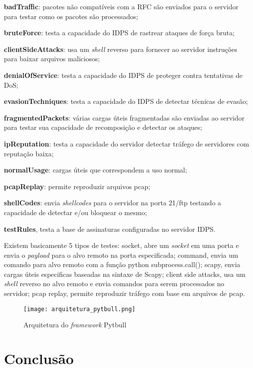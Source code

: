  \begin{alineas}
  \item \textbf{badTraffic}: pacotes não compatíveis com a RFC são enviados para o servidor para testar como os pacotes são processados; 
  \item \textbf{bruteForce}: testa a capacidade do IDPS de rastrear ataques de força bruta;
  \item \textbf{clientSideAttacks}: usa um \textit{shell} reverso para fornecer ao servidor instruções para baixar arquivos maliciosos; 
  \item \textbf{denialOfService}: testa a capacidade do IDPS de proteger contra tentativas de DoS; 
  \item \textbf{evasionTechniques}: testa a capacidade do IDPS de detectar técnicas de evasão; 
  \item \textbf{fragmentedPackets}: várias cargas úteis fragmentadas são enviadas ao servidor para testar sua capacidade de recomposição e detectar os ataques; 
  \item \textbf{ipReputation}: testa a capacidade do servidor detectar tráfego de servidores com reputação baixa;
  \item \textbf{normalUsage}: cargas úteis que correspondem a uso normal; 
  \item \textbf{pcapReplay}: permite reproduzir arquivos pcap; 
  \item \textbf{shellCodes}: envia \textit{shellcodes} para o servidor na porta 21/ftp testando a capacidade de detectar e/ou bloquear o mesmo; 
  \item \textbf{testRules}, testa a base de assinaturas configuradas no servidor IDPS.
 \end{alineas}

 Existem basicamente 5 tipos de testes: socket, abre um \textit{socket} em uma porta e envia o \textit{payload} para o alvo remoto na porta especificada; command, envia um comando para alvo remoto com a função python subprocess.call(); scapy, envia cargas úteis especificas baseadas na sintaxe de Scapy; client side attacks, usa um \textit{shell} reverso no alvo remoto e envia comandos para serem processados no servidor; pcap replay, permite reproduzir tráfego com base em arquivos de pcap.

 \begin{figure}[htb]
  \centering
  \caption{Arquitetura do \textit{framework} Pytbull}
  \texttt{[image: arquitetura\_pytbull.png]}
  \label{fig:pytbull}
 \end{figure}

 \section{Conclusão}
